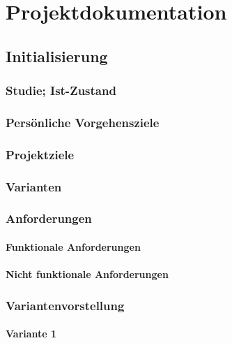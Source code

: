 \part{Projektdokumentation}

\chapter{Initialisierung}
\section{Studie; Ist-Zustand}
\section{Persönliche Vorgehensziele}
\section{Projektziele}
\section{Varianten}
\section{Anforderungen}
\subsection{Funktionale Anforderungen}
\subsection{Nicht funktionale Anforderungen}
\section{Variantenvorstellung}
\subsection{Variante 1}
\lipsum[1-3]
